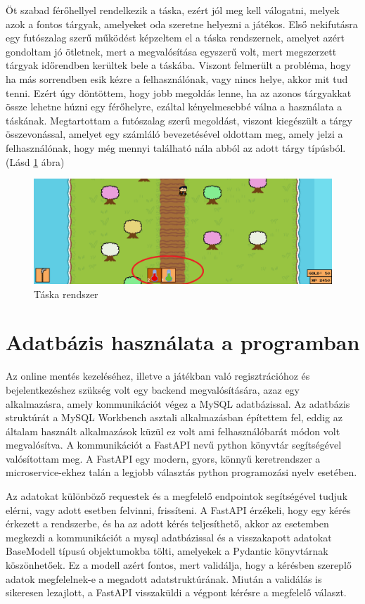 Öt szabad férőhellyel rendelkezik a táska, ezért jól meg kell válogatni, melyek azok a fontos tárgyak, amelyeket oda szeretne helyezni a játékos. Első nekifutásra egy futószalag szerű működést képzeltem el a táska rendszernek, amelyet azért gondoltam jó ötletnek, mert a megvalósítása egyszerű volt, mert megszerzett tárgyak időrendben kerültek bele a táskába. Viszont felmerült a probléma, hogy ha más sorrendben esik kézre a felhasználónak, vagy nincs helye, akkor mit tud tenni. Ezért úgy döntöttem, hogy jobb megoldás lenne, ha az azonos tárgyakkat össze lehetne húzni egy férőhelyre, ezáltal kényelmesebbé válna a használata a táskának. Megtartottam a futószalag szerű megoldást, viszont kiegészült a tárgy összevonással, amelyet egy számláló bevezetésével oldottam meg, amely jelzi a felhasználónak, hogy még mennyi található nála abból az adott tárgy típúsból. (Lásd \ref{fig:Táska rendszer} ábra)

\begin{figure}[H]
    \centering
    \includegraphics[width=15.5truecm]{images/inventory.png}
    \caption{Táska rendszer}
    \label{fig:Táska rendszer}
\end{figure}


\section{Adatbázis használata a programban}

 Az online mentés kezeléséhez, illetve a játékban való regisztrációhoz és bejelentkezéshez szükség volt egy backend megvalósítására, azaz egy alkalmazásra, amely kommunikációt végez a MySQL \cite{mysql} adatbázissal. Az adatbázis struktúrát a MySQL Workbench \cite{mysql-workbench} asztali alkalmazásban építettem fel, eddig az általam használt alkalmazások küzül ez volt ami felhasználóbarát módon volt megvalósítva.  A kommunikációt a FastAPI \cite{fastapi} nevű python könyvtár segítségével valósítottam meg. A FastAPI egy modern, gyors, könnyű keretrendszer a microservice-ekhez talán a legjobb választás python programozási nyelv esetében.

Az adatokat különböző requestek és a megfelelő endpointok segítségével tudjuk elérni, vagy adott esetben felvinni, frissíteni.
 A FastAPI érzékeli, hogy egy kérés érkezett a rendszerbe, és ha az adott kérés teljesíthető,
  akkor az esetemben megkezdi a kommunikációt a mysql adatbázissal és a visszakapott adatokat BaseModell \cite{basemodell} típusú objektumokba tölti,
   amelyekek a Pydantic \cite{pydantic} könyvtárnak köszönhetőek. Ez a modell azért fontos, mert validálja,
    hogy a kérésben szereplő adatok megfelelnek-e a megadott adatstruktúrának.
     Miután a validálás is sikeresen lezajlott, a FastAPI visszaküldi a végpont kérésre a megfelelő választ.

